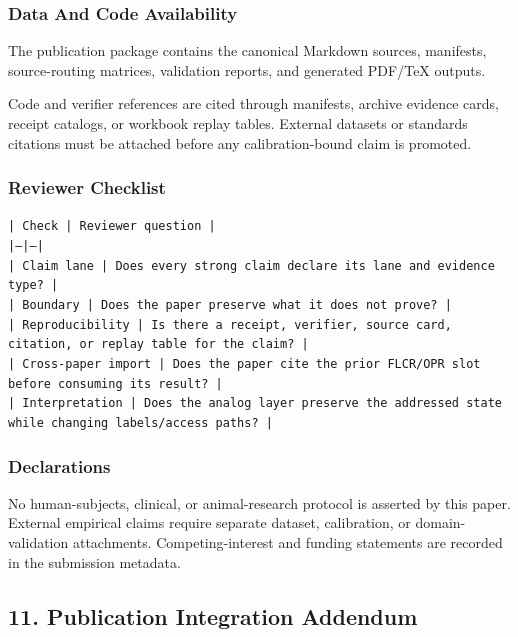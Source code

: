 \documentclass[11pt]{article}
\begin{document}
\subsubsection*{Data And Code Availability}

The publication package contains the canonical Markdown sources, manifests, source-routing matrices, validation reports, and generated PDF/TeX outputs.

Code and verifier references are cited through manifests, archive evidence cards, receipt catalogs, or workbook replay tables. External datasets or
standards citations must be attached before any calibration-bound claim is
promoted.

\subsubsection*{Reviewer Checklist}

\noindent\texttt{| Check | Reviewer question |}\\
\noindent\texttt{|---|---|}\\
\noindent\texttt{| Claim lane | Does every strong claim declare its lane and evidence type? |}\\
\noindent\texttt{| Boundary | Does the paper preserve what it does not prove? |}\\
\noindent\texttt{| Reproducibility | Is there a receipt, verifier, source card, citation, or replay table for the claim? |}\\
\noindent\texttt{| Cross-paper import | Does the paper cite the prior FLCR/OPR slot before consuming its result? |}\\
\noindent\texttt{| Interpretation | Does the analog layer preserve the addressed state while changing labels/access paths? |}\\

\subsubsection*{Declarations}

No human-subjects, clinical, or animal-research protocol is asserted by this
paper. External empirical claims require separate dataset, calibration, or
domain-validation attachments. Competing-interest and funding statements are recorded in the submission metadata.

\subsection*{11. Publication Integration Addendum}
\end{document}
